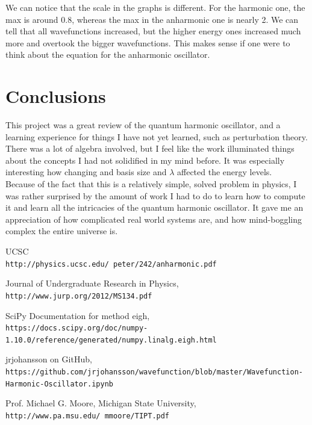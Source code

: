 \documentclass[12pt]{article}
\begin{document}
We can notice that the scale in the graphs is different. For the harmonic one, the max is around 0.8, whereas the max in the anharmonic one is nearly 2. We can tell that all wavefunctions increased, but the higher energy ones increased much more and overtook the bigger wavefunctions. This makes sense if one were to think about the equation for the anharmonic oscillator.

\section{Conclusions}
This project was a great review of the quantum harmonic oscillator, and a learning experience for things I have not yet learned, such as perturbation theory. There was a lot of algebra involved, but I feel like the work illuminated things about the concepts I had not solidified in my mind before. It was especially interesting how changing and basis size and $\lambda$ affected the energy levels. \\

Because of the fact that this is a relatively simple, solved problem in physics, I was rather surprised by the amount of work I had to do to learn how to compute it and learn all the intricacies of the quantum harmonic oscillator. It gave me an appreciation of how complicated real world systems are, and how mind-boggling complex the entire universe is. 



\begin{thebibliography}{9}

 UCSC
\\\texttt{http://physics.ucsc.edu/~peter/242/anharmonic.pdf}

Journal of Undergraduate Research in Physics, 
\\\texttt{http://www.jurp.org/2012/MS134.pdf}

SciPy Documentation for method eigh,
\\\texttt{https://docs.scipy.org/doc/numpy-1.10.0/reference/generated/numpy.linalg.eigh.html}

jrjohansson on GitHub, 
\\\texttt{https://github.com/jrjohansson/wavefunction/blob/master/Wavefunction-Harmonic-Oscillator.ipynb}

Prof. Michael G. Moore, Michigan State University, 
\\\texttt{http://www.pa.msu.edu/~mmoore/TIPT.pdf}


\end{thebibliography}
\end{document}
